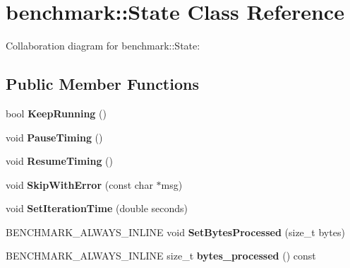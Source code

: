\hypertarget{classbenchmark_1_1_state}{}\section{benchmark\+:\+:State Class Reference}
\label{classbenchmark_1_1_state}


Collaboration diagram for benchmark\+:\+:State\+:
\subsection*{Public Member Functions}
\begin{DoxyCompactItemize}
\item 
\mbox{\label{classbenchmark_1_1_state_a2188056d2b8b203d0de4166f7eca2648}} 
bool {\bfseries Keep\+Running} ()
\item 
\mbox{\label{classbenchmark_1_1_state_a79b5da5d87a307d04f1402457953c158}} 
void {\bfseries Pause\+Timing} ()
\item 
\mbox{\label{classbenchmark_1_1_state_aa5f5b6caec015acde13ad6d8fb9da861}} 
void {\bfseries Resume\+Timing} ()
\item 
\mbox{\label{classbenchmark_1_1_state_a3015b06dd457aa5abf5cf03efea350ba}} 
void {\bfseries Skip\+With\+Error} (const char $\ast$msg)
\item 
\mbox{\label{classbenchmark_1_1_state_a7a04aa5e5428f064d1c84a90d5deca00}} 
void {\bfseries Set\+Iteration\+Time} (double seconds)
\item 
\mbox{\label{classbenchmark_1_1_state_a10e5dfe8dfb0f056a8225a0ed5769b3d}} 
B\+E\+N\+C\+H\+M\+A\+R\+K\+\_\+\+A\+L\+W\+A\+Y\+S\+\_\+\+I\+N\+L\+I\+NE void {\bfseries Set\+Bytes\+Processed} (size\+\_\+t bytes)
\item 
\mbox{\label{classbenchmark_1_1_state_a2db1a44415d32e3bc7608dab3fe78399}} 
B\+E\+N\+C\+H\+M\+A\+R\+K\+\_\+\+A\+L\+W\+A\+Y\+S\+\_\+\+I\+N\+L\+I\+NE size\+\_\+t {\bfseries bytes\+\_\+processed} () const
\item 
\mbox{\label{classbenchmark_1_1_state_a935810d3cd572ecc61624be1e9cbac1f}} 

\end{DoxyCompactItemize}
